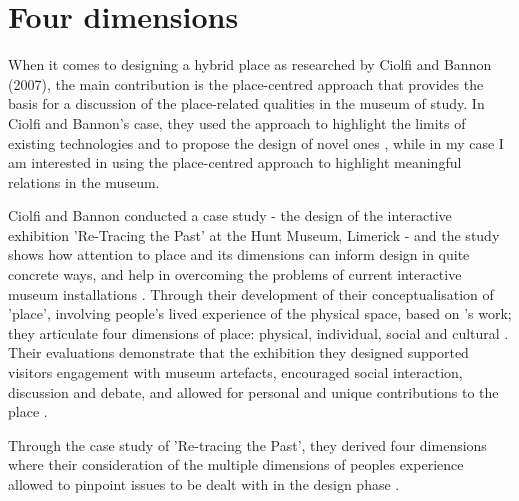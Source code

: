 \section{Four dimensions}
When it comes to designing a hybrid place as researched by Ciolfi and Bannon (2007), the main contribution is the place-centred approach that provides the basis for a discussion of the place-related qualities in the museum of study. In Ciolfi and Bannon's case, they used the approach to highlight the limits of existing technologies and to propose the design of novel ones \autocite[p. 163]{hybridplace_ciolfi}, while in my case I am interested in using the place-centred approach to highlight meaningful relations in the museum.

Ciolfi and Bannon conducted a case study - the design of the interactive exhibition 'Re-Tracing the Past' at the Hunt Museum, Limerick - and the study shows how attention to place and its dimensions can inform design in quite concrete ways, and help in overcoming the problems of current interactive museum installations \autocite[p. 178]{hybridplace_ciolfi}. Through their development of their conceptualisation of 'place', involving people's lived experience of the physical space, based on \autocite{Tuan_book}'s work; they articulate four dimensions of place: physical, individual, social and cultural \autocite[p. 178]{hybridplace_ciolfi}. Their evaluations demonstrate that the exhibition they designed supported visitors engagement with museum artefacts, encouraged social interaction, discussion and debate, and allowed for personal and unique contributions to the place \autocite[p. 178]{hybridplace_ciolfi}.

\par
Through the case study of 'Re-tracing the Past', they derived four dimensions where their consideration of the multiple dimensions of peoples experience allowed to pinpoint issues to be dealt with in the design phase \autocite[p. 178]{hybridplace_ciolfi}.

